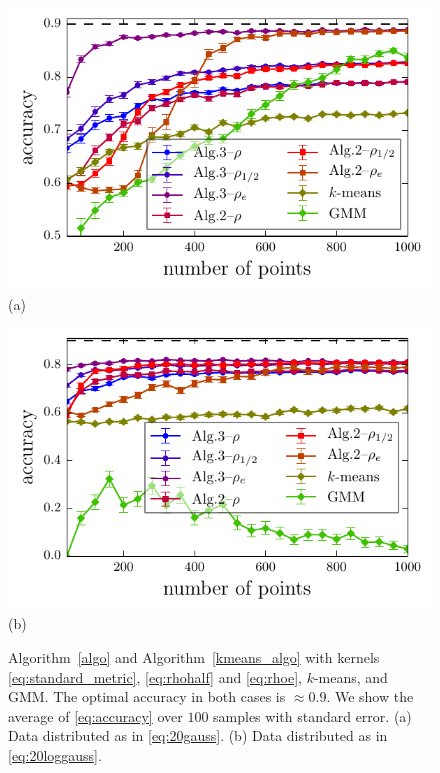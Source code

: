 \documentclass[aps,preprint,nofootinbib,floatfix]{revtex4-1}
\begin{document}
\begin{figure}
\begin{minipage}{0.49\textwidth}
\centering
\includegraphics[width=1\textwidth]{gauss.pdf}\\[-1.0em]
(a)
\end{minipage}
\begin{minipage}{0.49\textwidth}
\centering
\includegraphics[width=1\textwidth]{loggauss.pdf}\\[-1.0em]
(b)
\end{minipage}
\caption{
\label{fig:consist}
Algorithm~\ref{algo} and Algorithm~\ref{kmeans_algo} with kernels
\eqref{eq:standard_metric}, \eqref{eq:rhohalf} and \eqref{eq:rhoe}, 
$k$-means, and GMM. The optimal accuracy in both cases
is $\approx 0.9$. We show the average of \eqref{eq:accuracy}
over $100$ samples with standard error.
(a) Data distributed as in 
\eqref{eq:20gauss}. 
(b) Data distributed as in \eqref{eq:20loggauss}.
}
\end{figure}
\end{document}
